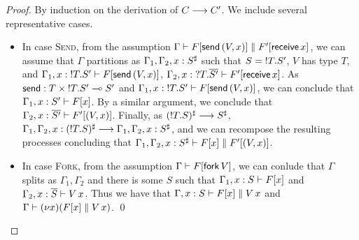 \documentclass[orivec,envcountsame]{llncs}
\begin{document}
\begin{proof}
  By induction on the derivation of $C \longrightarrow C'$.  We include several representative cases.
  \begin{itemize}
  \item In case \textsc{Send}, from the assumption $\Gamma \vdash F[\mathsf{send}\,(V,x)] \parallel
    F'[\mathsf{receive} \, x]$, we can assume that $\Gamma$ partitions as
    $\Gamma_1,\Gamma_2,x:S^\sharp$ such that $S = {!T.S'}$, $V$ has type $T$, and
    $\Gamma_1,x:{!T.S'} \vdash F[\mathsf{send} \, (V,x)]$,
    $\Gamma_2,x:{?T.\overline{S'}} \vdash F'[\mathsf{receive} \, x]$.  As $\mathsf{send} : T
    \times {!T.S'} \multimap S'$ and $\Gamma_1,x:{!T.S'} \vdash F[\mathsf{send} \,
    (V,x)]$, we can conclude that $\Gamma_1,x:S' \vdash F[x]$.  By a similar argument, we conclude
    that $\Gamma_2,x:\overline{S'} \vdash F'[(V,x)]$. Finally, as $({!T.S})^\sharp \longrightarrow
    S^\sharp$, $\Gamma_1,\Gamma_2,x:({!T.S})^\sharp \longrightarrow
    \Gamma_1,\Gamma_2,x:S^\sharp$, and we can recompose the resulting processes concluding that
    $\Gamma_1,\Gamma_2,x:S^\sharp \vdash F[x] \parallel F'[(V,x)]$.
  \item In case \textsc{Fork}, from the assumption $\Gamma \vdash F[\mathsf{fork} \, V]$, we
    can conlude that $\Gamma$ splits as $\Gamma_1,\Gamma_2$ and there is some $S$ such that
    $\Gamma_1,x:S \vdash F[x]$ and $\Gamma_2,x:\overline{S} \vdash V \, x$.  Thus we have that
    $\Gamma,x:S \vdash F[x] \parallel V \, x$ and $\Gamma \vdash (\nu x)(F[x] \parallel V \,
    x)$.
    \qed
  \end{itemize}
\end{proof}
\end{document}
